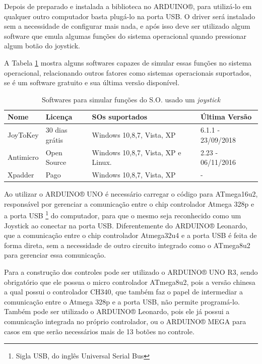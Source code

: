 \documentclass[
	12pt,			%
	openright,		%
	oneside,			%
	a4paper,			%
	chapter=TITLE,		%
	english,			%
	brazil,			%
	]{abntex2}
\begin{document}
Depois de preparado e instalada a biblioteca no ARDUINO®, para utilizá-lo em qualquer outro computador basta plugá-lo na porta USB. O driver será instalado sem a necessidade de configurar mais nada, e após isso deve ser utilizado algum software que emula algumas funções do sistema operacional quando pressionar algum botão do joystick.

A Tabela \ref{tab:tab-3} mostra alguns softwares capazes de simular essas funções no sistema operacional, relacionando outros fatores como sistemas operacionais suportados, se é um software gratuito e sua última versão disponível.

\begin{table}[H]
\caption{Softwares para simular funções do S.O. usado um \emph{joystick}}
\label{tab:tab-3}
{
\centering
\footnotesize
\begin{tabular}{|p{2cm}|p{3cm}|p{6cm}|p{3cm}|}
\hline
\textbf{Nome} & \textbf{Licença} & \textbf{SOs suportados} & \textbf{Última Versão}\\
\hline
JoyToKey	&30 dias grátis				&Windows 10,8,7, Vista, XP		&6.1.1 - 23/09/2018\\
\hline
Antimicro	&Open Source				&Windows 10,8,7, Vista, XP e Linux.	&2.23 - 06/11/2016\\
\hline
Xpadder	&Pago						&Windows 10,8,7, Vista, XP 		&-\\
\hline
\end{tabular}
}
\end{table}

Ao utilizar o ARDUINO® UNO é necessário carregar o código para ATmega16u2, responsável por gerenciar a comunicação entre o chip controlador Atmega 328p e a porta USB \footnote{Sigla USB, do inglês Universal Serial Bus} do computador, para que o mesmo seja reconhecido como um Joystick ao conectar na porta USB. Diferentemente do ARDUINO® Leonardo, que a comunicação entre o chip controlador Atmega32u4 e a porta USB é feita de forma direta, sem a necessidade de outro circuito integrado como o ATmega8u2 para gerenciar essa comunicação.

Para a construção dos controles pode ser utilizado o ARDUINO® UNO R3, sendo obrigatório que ele possua o micro controlador ATmega8u2, pois a versão chinesa a qual possui o controlador CH340, que também faz o papel de intermediar a comunicação entre o Atmega 328p e a porta USB, não permite programá-lo. Também pode ser utilizado o ARDUINO® Leonardo, pois ele já possui a comunicação integrada no próprio controlador, ou o ARDUINO® MEGA para casos em que serão necessários mais de 13 botões no controle.
\end{document}
